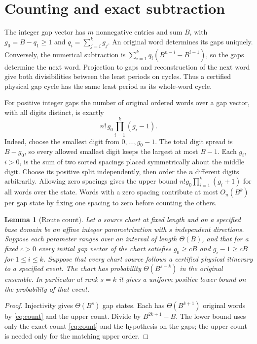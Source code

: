 \documentclass[11pt,reqno]{amsart}
\newtheorem{lemma}[theorem]{Lemma}
\theoremstyle{remark}
\begin{document}
\section{Counting and exact subtraction}\label{sec:framework}

The integer gap vector has \(m\) nonnegative entries and sum \(B\), with
\(g_0=B-q_1\ge1\) and
\(q_i=\sum_{j=i}^k g_j\). An original word determines its gaps uniquely.
Conversely, the numerical subtraction is
\(\sum_{i=1}^kq_i(B^{n-i}-B^{i-1})\), so the gaps determine the next
word. Projection to gaps and reconstruction of the next word give
both divisibilities between the least periods on cycles. Thus
a certified physical gap cycle has the same least period as its
whole-word cycle.

For positive integer gaps the number of original ordered words over
a gap vector, with all digits distinct, is exactly
\begin{equation}\label{eq:count}
                         n!\,g_0\prod_{i=1}^k(g_i-1).
\end{equation}
Indeed, choose the smallest digit from \(0,\ldots,g_0-1\).
The total digit spread is \(B-g_0\), so every allowed smallest
digit keeps the largest at most \(B-1\). Each \(g_i\), \(i>0\),
is the sum of two sorted spacings placed symmetrically about
the middle digit. Choose its positive split
independently, then order the \(n\) different digits arbitrarily.
Allowing zero spacings gives the upper bound
\(n!g_0\prod_{i=1}^k(g_i+1)\) for all words over the state.
Words with a zero spacing contribute at most \(O_n(B^k)\) per
gap state by fixing one spacing to zero before counting the others.

\begin{lemma}[Route count]\label{lem:route}
Let a source chart at fixed length and on a specified base domain
be an affine integer parametrization with \(s\) independent directions.
Suppose each parameter ranges over an interval of length
\(\Theta(B)\), and that for a fixed \(c>0\) every initial gap vector
of the chart satisfies \(g_0\ge cB\) and \(g_i-1\ge cB\) for
\(1\le i\le k\). Suppose that every chart source follows a certified
physical itinerary to a specified event. The chart has probability
\(\Theta(B^{s-k})\) in the original ensemble. In particular at rank
\(s=k\) it gives a uniform positive lower bound on the probability
of that event.
\end{lemma}
\begin{proof}
Injectivity gives \(\Theta(B^s)\) gap states. Each has
\(\Theta(B^{k+1})\) original words by \eqref{eq:count} and the
upper count. Divide by \(B^{2k+1}-B\). The lower bound uses only the
exact count \eqref{eq:count} and the hypothesis on the gaps; the upper
count is needed only for the matching upper order.
\end{proof}
\end{document}
